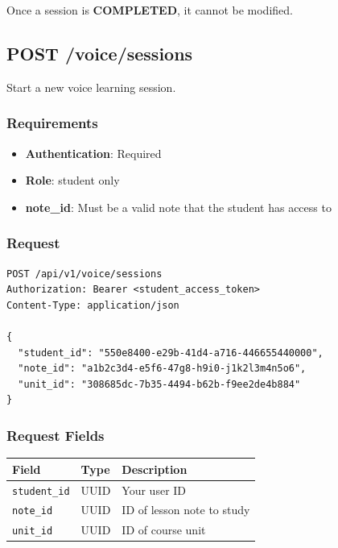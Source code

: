 \documentclass[12pt,a4paper,oneside]{article}
\begin{document}
Once a session is \textbf{COMPLETED}, it cannot be modified.

\subsection{POST /voice/sessions}

Start a new voice learning session.

\subsubsection{Requirements}

\begin{itemize}
    \item \textbf{Authentication}: Required
    \item \textbf{Role}: student only
    \item \textbf{note\_id}: Must be a valid note that the student has access to
\end{itemize}

\subsubsection{Request}

\begin{lstlisting}
POST /api/v1/voice/sessions
Authorization: Bearer <student_access_token>
Content-Type: application/json

{
  "student_id": "550e8400-e29b-41d4-a716-446655440000",
  "note_id": "a1b2c3d4-e5f6-47g8-h9i0-j1k2l3m4n5o6",
  "unit_id": "308685dc-7b35-4494-b62b-f9ee2de4b884"
}
\end{lstlisting}

\subsubsection{Request Fields}

\begin{table}[H]
\centering
\small
\begin{tabular}{|l|l|l|}
\hline
\textbf{Field} & \textbf{Type} & \textbf{Description} \\
\hline
\texttt{student\_id} & UUID & Your user ID \\
\hline
\texttt{note\_id} & UUID & ID of lesson note to study \\
\hline
\texttt{unit\_id} & UUID & ID of course unit \\
\hline
\end{tabular}
\end{table}
\end{document}
